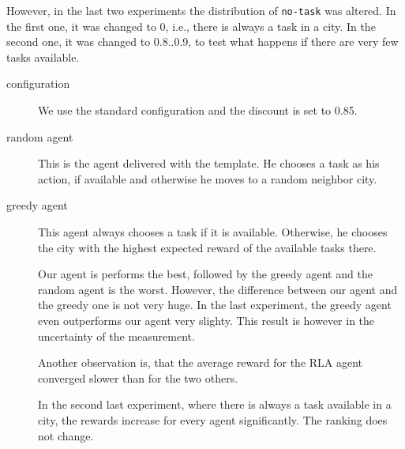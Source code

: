 \documentclass[11pt]{article}
\begin{document}
However, in the last two experiments the distribution of \texttt{no-task} was altered.
In the first one, it was changed to 0, i.e., there is always a task in a city.
In the second one, it was changed to 0.8..0.9, to test what happens if there are very few tasks available.
\begin{description}
\item[configuration] We use the standard configuration and the discount is set to 0.85.
\item[random agent]
This is the agent delivered with the template.
He chooses a task as his action, if available and otherwise he moves to a random neighbor city.
\item [greedy agent]
This agent always chooses a task if it is available.
Otherwise, he chooses the city with the highest expected reward of the available tasks there.

Our agent is performs the best, followed by the greedy agent and the random agent is the worst.
However, the difference between our agent and the greedy one is not very huge.
In the last experiment, the greedy agent even outperforms our agent very slighty. 
This result is however in the uncertainty of the measurement.

Another observation is, that the average reward for the RLA agent converged slower than for the two others.

In the second last experiment, where there is always a task available in a city, the rewards increase for every agent significantly.
The ranking does not change.


\end{description}
\end{document}
